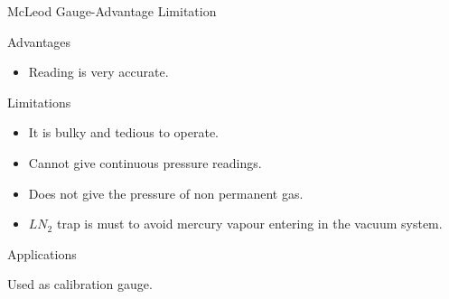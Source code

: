 \documentclass[11pt]{beamer}
\begin{document}
\begin{frame}{McLeod Gauge-Advantage Limitation }

       \begin{exampleblock}{Advantages}
          \begin{itemize}
           
           \item Reading is very accurate.
     
          \end{itemize}
        
       
       \end{exampleblock}
       
       \begin{exampleblock}{Limitations}
          \begin{itemize}
           
           \item It is bulky and tedious to operate.
           \item Cannot give continuous pressure readings.
           \item Does not give the pressure of non permanent gas.
 			\item $LN_{2}$ trap is must to avoid mercury vapour entering in the vacuum system.
          \end{itemize}
        
       
       \end{exampleblock}


     \begin{exampleblock}{Applications}
                   
           Used as calibration gauge.
                
       \end{exampleblock}

\end{frame}
\end{document}
